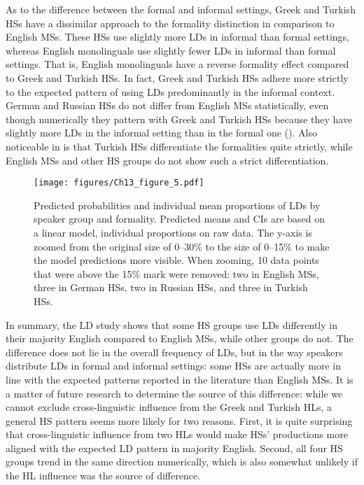 \documentclass[output=paper,colorlinks,citecolor=brown]{langscibook}
\begin{document}
As to the difference between the formal and informal settings, Greek and Turkish HSs have a dissimilar approach to the formality distinction in comparison to English MSs. These HSs use slightly more LDs in informal than formal settings, whereas English monolinguals use slightly fewer LDs in informal than formal settings. That is, English monolinguals have a reverse formality effect compared to Greek and Turkish HSs. In fact, Greek and Turkish HSs adhere more strictly to the expected pattern of using LDs predominantly in the informal context. German and Russian HSs do not differ from English MSs statistically, even though numerically they pattern with Greek and Turkish HSs because they have slightly more LDs in the informal setting than in the formal one (). Also noticeable in  is that Turkish HSs differentiate the formalities quite strictly, while English MSs and other HS groups do not show such a strict differentiation.

\begin{figure}
    \texttt{[image: figures/Ch13\_figure\_5.pdf]}
    \caption{Predicted probabilities and individual mean proportions of LDs by speaker group and formality. Predicted means and CIs are based on a linear model, individual proportions on raw data. The y-axis is zoomed from the original size of 0--30\% to the size of 0--15\% to make the model predictions more visible. When zooming, 10 data points that were above the 15\% mark were removed: two in English MSs, three in German HSs, two in Russian HSs, and three in Turkish HSs.}
    \label{fig:pashkovaetal:5}
\end{figure}

In summary, the LD study shows that some HS groups use LDs differently in their majority English compared to English MSs, while other groups do not. The difference does not lie in the overall frequency of LDs, but in the way speakers distribute LDs in formal and informal settings: some HSs are actually more in line with the expected patterns reported in the literature than English MSs. It is a matter of future research to determine the source of this difference: while we cannot exclude cross-linguistic influence from the Greek and Turkish HLs, a general HS pattern seems more likely for two reasons. First, it is quite surprising that cross-linguistic influence from two HLs would make HSs’ productions more aligned with the expected LD pattern in majority English. Second, all four HS groups trend in the same direction numerically, which is also somewhat unlikely if the HL influence was the source of difference.
\end{document}

